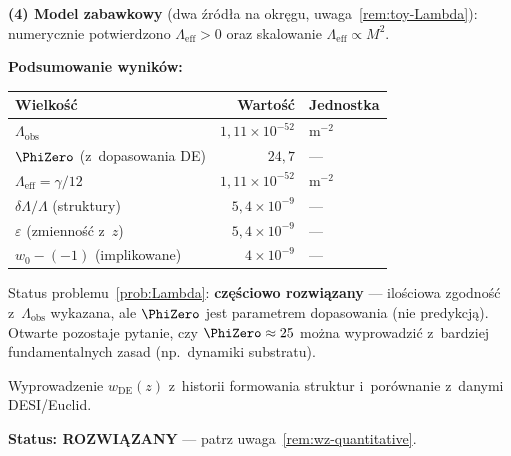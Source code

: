 \begin{remark}
\medskip\noindent
\textbf{(4) Model zabawkowy} (dwa \'zr\'od\l{}a na okr\k{e}gu,
uwaga~\ref{rem:toy-Lambda}): numerycznie potwierdzono
$\Lambda_{\mathrm{eff}} > 0$ oraz skalowanie
$\Lambda_{\mathrm{eff}} \propto M^2$.

\medskip\noindent
\textbf{Podsumowanie wynik\'ow:}
\begin{center}
\begin{tabular}{lrl}
\hline
Wielko\'s\'c & Warto\'s\'c & Jednostka \\
\hline
$\Lambda_{\mathrm{obs}}$ & $1{,}11 \times 10^{-52}$ & $\mathrm{m}^{-2}$ \\
$\PhiZero$ (z~dopasowania DE) & $24{,}7$ & --- \\
$\Lambda_{\mathrm{eff}} = \gamma/12$ & $1{,}11 \times 10^{-52}$ & $\mathrm{m}^{-2}$ \\
$\delta\Lambda/\Lambda$ (struktury) & $5{,}4 \times 10^{-9}$ & --- \\
$\varepsilon$ (zmienno\'s\'c z~$z$) & $5{,}4 \times 10^{-9}$ & --- \\
$w_0 - (-1)$ (implikowane) & $4 \times 10^{-9}$ & --- \\
\hline
\end{tabular}
\end{center}

Status problemu~\ref{prob:Lambda}:
\textbf{cz\k{e}\'sciowo rozwi\k{a}zany} --- ilo\'sciowa
zgodno\'s\'c z~$\Lambda_{\mathrm{obs}}$ wykazana, ale
$\PhiZero$ jest parametrem dopasowania (nie predykcj\k{a}).
Otwarte pozostaje pytanie, czy $\PhiZero \approx 25$ mo\.zna
wyprowadzi\'c z~bardziej fundamentalnych zasad (np.\ dynamiki
substratu).
\end{remark}

\begin{problem}\label{prob:wz}
Wyprowadzenie $w_{\mathrm{DE}}(z)$ z~historii formowania
struktur i~por\'ownanie z~danymi DESI/Euclid.

\textbf{Status: ROZWI\k{A}ZANY} --- patrz uwaga~\ref{rem:wz-quantitative}.
\end{problem}

